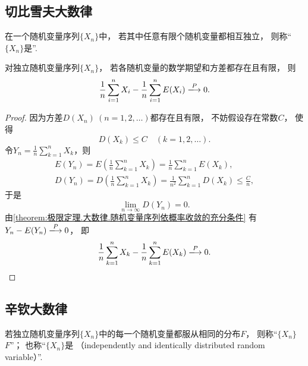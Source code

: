 \subsection{切比雪夫大数律}
\begin{definition}
在一个随机变量序列\(\{X_n\}\)中，
若其中任意有限个随机变量都相互独立，
则称“\(\{X_n\}\)是”.
\end{definition}

\begin{theorem}[切比雪夫大数律]\label{theorem:极限定理.大数律.切比雪夫大数律}
对独立随机变量序列\(\{X_n\}\)，
若各随机变量的数学期望和方差都存在且有限，
则\begin{equation*}
	\frac1n \sum_{i=1}^n X_i
	- \frac1n \sum_{i=1}^n E(X_i)
	\toP 0.
\end{equation*}
\begin{proof}
因为方差\(D(X_n)\ (n=1,2,\dotsc)\)都存在且有限，
不妨假设存在常数\(C\)，
使得\begin{equation*}
	D(X_k) \leq C
	\quad(k=1,2,\dotsc).
\end{equation*}
\def\Yn{\frac1n \sum_{k=1}^n X_k}
令\(Y_n=\Yn\)，则\begin{gather*}
	E(Y_n)
	= E\left(\Yn\right)
	= \frac1n \sum_{k=1}^n E(X_k), \\
	D(Y_n)
	= D\left(\Yn\right)
	= \frac{1}{n^2} \sum_{k=1}^n D(X_k) \leq \frac{C}{n},
\end{gather*}
于是\begin{equation*}
	\lim_{n\to\infty} D(Y_n)
	= 0.
\end{equation*}
由\cref{theorem:极限定理.大数律.随机变量序列依概率收敛的充分条件}
有\(Y_n - E(Y_n) \toP 0\)，
即\begin{equation*}
	\frac1n \sum_{k=1}^n X_k
	- \frac1n \sum_{k=1}^n E(X_k)
	\toP 0.
	\qedhere
\end{equation*}
\end{proof}
\end{theorem}

\subsection{辛钦大数律}
\begin{definition}
若独立随机变量序列\(\{X_n\}\)中的每一个随机变量都服从相同的分布\(F\)，
则称“\(\{X_n\}\)  \(F\)”；
也称“\(\{X_n\}\)是%
（independently and identically distributed random variable）”.
\end{definition}


